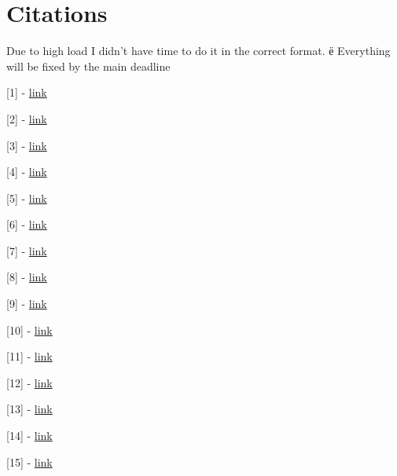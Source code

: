\section{Citations}\label{sec:citations}


\begin{citations}

Due to high load I didn't have time to do it in the correct format. ё
Everything will be fixed by the main deadline

[1] - \href{https://elibrary.ru/item.asp?id=32601827}{link}

[2] - \href{https://www.researchgate.net/publication/319873963\_Comparative\_Analysis\_of\_Automated\_Load\_Testing\_Tools\_Apache\_JMeter\_Microsoft\_Visual\_Studio\_TFS\_LoadRunner\_Siege}{link}

[3] - \href{https://github.com/yandex-load/phantom}{link}

[4] - \href{https://github.com/yandex-load/yandex-tank-api}{link}

[5] - \href{https://sre.google/sre-book/handling-overload/}{link}

[6] - \href{https://acme.able.cs.cmu.edu/pubs/uploads/pdf/PID6370763.pdf}{link}

[7] - \href{https://iopscience.iop.org/article/10.1088/1757-899X/1077/1/012065}{link}

[8] - \href{https://cloud.google.com/storage/docs/retry-strategy#client-libraries}{link}

[9] - \href{https://developer.hashicorp.com/consul/docs}{link}

[10] - \href{https://hrcak.srce.hr/en/clanak/321176\%3F}{link}

[11] - \href{https://ieeexplore.ieee.org/abstract/document/7965448}{link}

[12] - \href{https://elementallinks.com/el-reports/EventDrivenArchitectureOverview\_ElementalLinks\_Feb2011.pdf}{link}

[13] - \href{https://arxiv.org/abs/1912.03715}{link}

[14] - \href{https://docs.docker.com/get-started/}{link}

[15] - \href{https://kubernetes.io/docs/concepts/overview/what-is-kubernetes/}{link}
\end{citations}